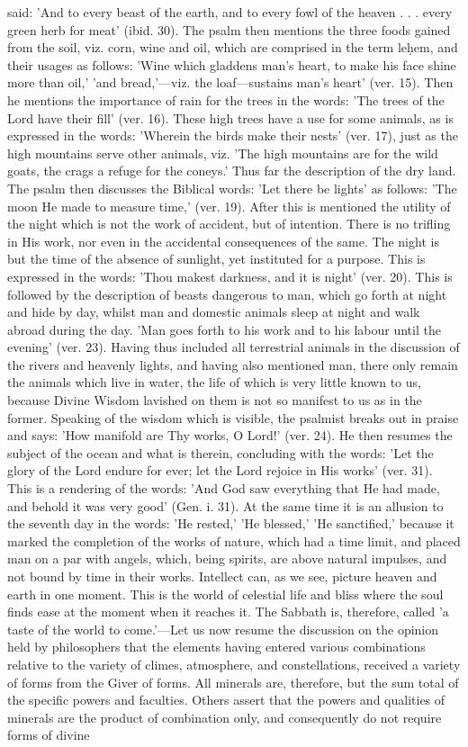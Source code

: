 \documentclass[12pt]{article}
\begin{document}
said: 'And to every beast of the earth, and to every fowl of the heaven . . . every green herb for meat' (ibid. 30). The psalm then mentions the three foods gained from the soil, viz. corn, wine and oil, which are comprised in the term leḥem, and their usages as follows: 'Wine which gladdens man's heart, to make his face shine more than oil,' 'and bread,'---viz. the loaf---sustains man's heart' (ver. 15). Then he mentions the importance of rain for the trees in the words: 'The trees of the Lord have their fill' (ver. 16). These high trees have a use for some animals, as is expressed in the words: 'Wherein the birds make their nests' (ver. 17), just as the high mountains serve other animals, viz. 'The high mountains are for the wild goats, the crags a refuge for the coneys.' Thus far the description of the dry land. The psalm then discusses the Biblical words: 'Let there be lights' as follows: 'The moon He made to measure time,' (ver. 19). After this is mentioned the utility of the night which is not the work of accident, but of intention. There is no trifling in His work, nor even in the accidental consequences of the same. The night is but the time of the absence of sunlight, yet instituted for a purpose. This is expressed in the words: 'Thou makest darkness, and it is night' (ver. 20). This is followed by the description of beasts dangerous to man, which go forth at night and hide by day, whilst man and domestic animals sleep at night and walk abroad during the day. 'Man goes forth to his work and to his labour until the evening' (ver. 23). Having thus included all terrestrial animals in the discussion of the rivers and heavenly lights, and having also mentioned man, there only remain the animals which live in water, the life of which is very little known to us, because Divine Wisdom lavished on them is not so manifest to us as in the former. Speaking of the wisdom which is visible, the psalmist breaks out in praise and says: 'How manifold are Thy works, O Lord!' (ver. 24). He then resumes the subject of the ocean and what is therein, concluding with the words: 'Let the glory of the Lord endure for ever; let the Lord rejoice in His works' (ver. 31). This is a rendering of the words: 'And God saw everything that He had made, and behold it was very good' (Gen. i. 31). At the same time it is an allusion to the seventh day in the words: 'He rested,' 'He blessed,' 'He sanctified,' because it marked the completion of the works of nature, which had a time limit, and placed man on a par with angels, which, being spirits, are above natural impulses, and not bound by time in their works. Intellect can, as we see, picture heaven and earth in one moment. This is the world of celestial life and bliss where the soul finds ease at the moment when it reaches it. The Sabbath is, therefore, called 'a taste of the world to come.'---Let us now resume the discussion on the opinion held by philosophers that the elements having entered various combinations relative to the variety of climes, atmosphere, and constellations, received a variety of forms from the Giver of forms. All minerals are, therefore, but the sum total of the specific powers and faculties. Others assert that the powers and qualities of minerals are the product of combination only, and consequently do not require forms of divine 
\end{document}
